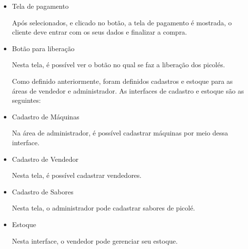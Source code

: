 \begin{itemize}
\item{Tela de pagamento}


Após selecionados, e clicado no botão, a tela de pagamento é mostrada, o cliente deve entrar com os seus dados e finalizar a compra.

\item{Botão para liberação}


Nesta tela, é possível ver o botão no qual se faz a liberação dos picolés.


Como definido anteriormente, foram definidos cadastros e estoque para as áreas de vendedor e administrador. As interfaces de cadastro e estoque são as seguintes:

\item{Cadastro de Máquinas}


Na área de administrador, é possível cadastrar máquinas por meio dessa interface.

\item{Cadastro de Vendedor}


Nesta tela, é possível cadastrar vendedores.

\item{Cadastro de Sabores}


Nesta tela, o administrador pode cadastrar sabores de picolé.

\item{Estoque}


Nesta interface, o vendedor pode gerenciar seu estoque.

\end{itemize}

